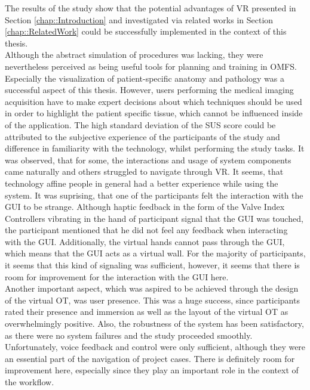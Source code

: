 The results of the study show that the potential advantages of VR 
presented in Section \ref{chap::Introduction} 
and investigated via related works in Section \ref{chap::RelatedWork}
could be successfully implemented in the context of this thesis. 
\\ Although the abstract simulation of 
procedures was lacking, they were nevertheless perceived as being 
useful tools for planning and training in OMFS.
Especially the visualization of patient-specific 
anatomy and pathology was a successful aspect of this thesis.
However, users performing the medical imaging acquisition have to make expert 
decisions about which techniques should be used in order to highlight the 
patient specific tissue, which cannot be influenced inside of the application.
The high standard deviation of the SUS score could be attributed
to the subjective experience of the participants of the study and difference in familiarity with the technology,
whilst performing the study tasks. It was observed, 
that for some, the interactions and usage of system components 
came naturally and others struggled to navigate through VR.
It seems, that technology affine people in general had a better
experience while using the system. 
It was suprising, that one of the participants felt the interaction with
the GUI to be strange. Although haptic feedback in the form of 
the Valve Index Controllers vibrating in the hand of participant 
signal that the GUI was touched, the participant mentioned that
he did not feel any feedback when interacting with the GUI.
Additionally, the virtual hands cannot pass through the GUI, which
means that the GUI acts as a virtual wall. For the majority of
participants, it seems that this kind of signaling was sufficient, 
however, it seems that there is room for improvement for the
interaction with the GUI here.
\\ Another important aspect, which was aspired to be achieved through
the design of the virtual OT, was user presence. 
This was a huge success, since participants rated their presence and 
immersion as well as the layout of the virtual OT as overwhelmingly positive. 
Also, the robustness of the system has been satisfactory, as
there were no system failures and the study proceeded smoothly.
\\ Unfortunately, voice feedback and control were only sufficient, 
although they were an essential part of the navigation of 
project cases. There is definitely room for improvement here, 
especially since they play an important role in the context of the workflow.
